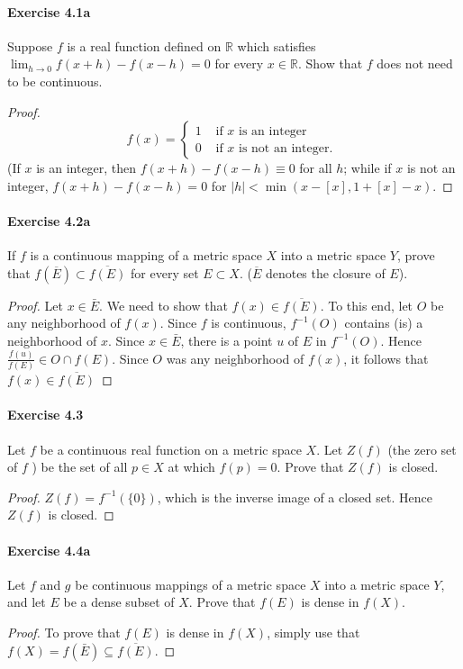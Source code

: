 \documentclass{article}
\theoremstyle{definition}
\begin{document}
\paragraph{Exercise 4.1a} Suppose $f$ is a real function defined on $\mathbb{R}$ which satisfies $\lim_{h \rightarrow 0} f(x + h) - f(x - h) = 0$ for every $x \in \mathbb{R}$. Show that $f$ does not need to be continuous.
\begin{proof}
    $$
f(x)= \begin{cases}1 & \text { if } x \text { is an integer } \\ 0 & \text { if } x \text { is not an integer. }\end{cases}
$$
(If $x$ is an integer, then $f(x+h)-f(x-h) \equiv 0$ for all $h$; while if $x$ is not an integer, $f(x+h)-f(x-h)=0$ for $|h|<\min (x-[x], 1+[x]-x)$.
\end{proof}


\paragraph{Exercise 4.2a} If $f$ is a continuous mapping of a metric space $X$ into a metric space $Y$, prove that $f(\overline{E}) \subset \overline{f(E)}$ for every set $E \subset X$. ($\overline{E}$ denotes the closure of $E$).
\begin{proof}
    Let $x \in \bar{E}$. We need to show that $f(x) \in \overline{f(E)}$. To this end, let $O$ be any neighborhood of $f(x)$. Since $f$ is continuous, $f^{-1}(O)$ contains (is) a neighborhood of $x$. Since $x \in \bar{E}$, there is a point $u$ of $E$ in $f^{-1}(O)$. Hence $\frac{f(u)}{f(E)} \in O \cap f(E)$. Since $O$ was any neighborhood of $f(x)$, it follows that $f(x) \in \overline{f(E)}$
\end{proof}


\paragraph{Exercise 4.3} Let $f$ be a continuous real function on a metric space $X$. Let $Z(f)$ (the zero set of $f$ ) be the set of all $p \in X$ at which $f(p)=0$. Prove that $Z(f)$ is closed.
\begin{proof}
    $Z(f)=f^{-1}(\{0\})$, which is the inverse image of a closed set. Hence $Z(f)$ is closed.
\end{proof}


\paragraph{Exercise 4.4a} Let $f$ and $g$ be continuous mappings of a metric space $X$ into a metric space $Y$, and let $E$ be a dense subset of $X$. Prove that $f(E)$ is dense in $f(X)$.
\begin{proof}
    To prove that $f(E)$ is dense in $f(X)$, simply use that $f(X)=f(\bar{E}) \subseteq \overline{f(E)}$.
\end{proof}
\end{document}
